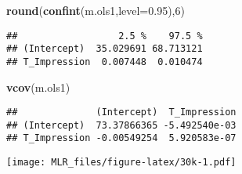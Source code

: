 \documentclass[
]{article}
\newenvironment{Shaded}{\begin{snugshade}}{\end{snugshade}}
\newcommand{\CommentTok}[1]{\textcolor[rgb]{0.56,0.35,0.01}{\textit{#1}}}
\newcommand{\DataTypeTok}[1]{\textcolor[rgb]{0.13,0.29,0.53}{#1}}
\newcommand{\DecValTok}[1]{\textcolor[rgb]{0.00,0.00,0.81}{#1}}
\newcommand{\FloatTok}[1]{\textcolor[rgb]{0.00,0.00,0.81}{#1}}
\newcommand{\KeywordTok}[1]{\textcolor[rgb]{0.13,0.29,0.53}{\textbf{#1}}}
\newcommand{\NormalTok}[1]{#1}
\newcommand{\OperatorTok}[1]{\textcolor[rgb]{0.81,0.36,0.00}{\textbf{#1}}}
\newcommand{\StringTok}[1]{\textcolor[rgb]{0.31,0.60,0.02}{#1}}
\begin{document}
\begin{Shaded}
\begin{Highlighting}[]
\KeywordTok{round}\NormalTok{(}\KeywordTok{confint}\NormalTok{(m.ols1,}\DataTypeTok{level=}\FloatTok{0.95}\NormalTok{),}\DecValTok{6}\NormalTok{)}
\end{Highlighting}
\end{Shaded}

\begin{verbatim}
##                  2.5 %    97.5 %
## (Intercept)  35.029691 68.713121
## T_Impression  0.007448  0.010474
\end{verbatim}

\begin{Shaded}
\begin{Highlighting}[]
\KeywordTok{vcov}\NormalTok{(m.ols1)}
\end{Highlighting}
\end{Shaded}

\begin{verbatim}
##              (Intercept)  T_Impression
## (Intercept)  73.37866365 -5.492540e-03
## T_Impression -0.00549254  5.920583e-07
\end{verbatim}

\begin{Shaded}
\end{Shaded}

\texttt{[image: MLR\_files/figure-latex/30k-1.pdf]}

\begin{Shaded}
\end{Shaded}
\end{document}
